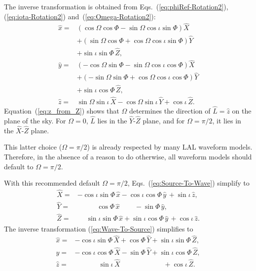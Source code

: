 \documentclass[11pt,tightenlines,article,amssymb,amsmath,amsfonts,superscriptaddress]{revtex4}
\newcommand{\lNR}{\hat L}
\newcommand{\ExS}{{{\hat x}}}
\newcommand{\EyS}{{{\hat y}}}
\newcommand{\EzS}{{{\hat z}}}
\newcommand{\ExW}{\hat X}
\newcommand{\EyW}{\hat Y}
\newcommand{\EzW}{\hat Z}
\newcommand{\phiRef}{\Phi} %
\begin{document}
The inverse transformation is obtained from
Eqs.~(\ref{eq:phiRef-Rotation2}), (\ref{eq:iota-Rotation2})
and~(\ref{eq:Omega-Rotation2}):
\begin{subequations}
  \label{eq:Wave-To-Source}
  \begin{align}
    \ExS=& \left(\cos\Omega\cos\phiRef-\sin\Omega\cos\iota\sin\phiRef\right)\ExW
    \nonumber \\
    & + \left(\sin\Omega\cos\phiRef+\cos\Omega\cos\iota\sin\phiRef\right)\EyW
    \nonumber\\
    & + \sin\iota\sin\phiRef\,\EzW,\\
\EyS=& \left(-\cos\Omega\sin\phiRef-\sin\Omega\cos\iota\cos\phiRef\right)\ExW
    \nonumber \\
    & + \left(-\sin\Omega\sin\phiRef+\cos\Omega\cos\iota\cos\phiRef\right)\EyW
    \nonumber\\
    & + \sin\iota\cos\phiRef\,\EzW,\\
\label{eq:z_from_Z}
    \EzS=&\sin\Omega\sin\iota\,\ExW-\cos\Omega\sin\iota\,\EyW + \cos\iota\,\EzW.
  \end{align}
  \end{subequations}
Equation~(\ref{eq:z_from_Z}) shows that $\Omega$ determines the
direction of $\lNR=\hat z$ on the plane of the sky.  For $\Omega=0$,
$\lNR$ lies in the $\EyW$-$\EzW$ plane, and for $\Omega=\pi/2$, it lies
in the $\ExW$-$\EzW$ plane.

This latter choice ($\Omega=\pi/2$) is already respected by many LAL
waveform models.  Therefore, in the absence of a reason to do
otherwise, all waveform models should default to $\Omega=\pi/2$.  

With this recommended default $\Omega=\pi/2$,
Eqs.~(\ref{eq:Source-To-Wave}) simplify to
\begin{subequations}
  \label{eq:Source-To-Wave-Omega0}
  \begin{align}
    \ExW=& -\cos\iota\sin\phiRef\,\ExS-\cos\iota\cos\phiRef\,\EyS\,+\sin\iota\,\EzS,\\
    \EyW=&\quad\quad\;\;\; \cos\phiRef\,\ExS\qquad\,-\sin\phiRef\,\EyS,\\
\label{eq:Z_from_z-Omega0}
\EzW=&\;\;\;\;\,\sin\iota\sin\phiRef\,\ExS+\sin\iota\cos\phiRef\,\EyS\, + \cos\iota\,\EzS.
  \end{align}
  \end{subequations}
The inverse transformation (\ref{eq:Wave-To-Source}) simplifies to 
\begin{subequations}
  \label{eq:Wave-To-Source-Omega0}
  \begin{align}
    \ExS=& -\cos\iota\sin\phiRef\,\ExW+\cos\phiRef\,\EyW
    + \sin\iota\sin\phiRef\,\EzW,\\
    \EyS=& -\cos\iota\cos\phiRef\,\ExW-\sin\phiRef\,\EyW
    + \sin\iota\cos\phiRef\,\EzW,\\
    \EzS=&\qquad\quad\;\,\sin\iota\,\ExW \qquad\qquad\qquad\;+\cos\iota\,\EzW.
  \end{align}
  \end{subequations}
\end{document}
